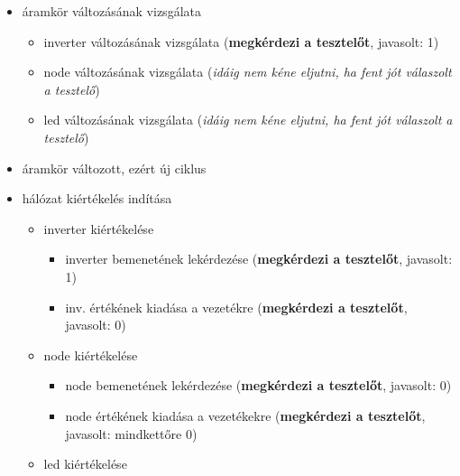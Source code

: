 {\begin{itemize}
\begin{itemize}
\begin{itemize}
	\begin{itemize}
	\setlength{\itemsep}{0cm}%
	\setlength{\parskip}{0cm}%
	\setlength{\itemindent}{-65pt}%
		\item led bemenetének lekérdezése (\textbf{megkérdezi a tesztelőt}, javasolt: 1)
	\end{itemize}
\end{itemize}
\item áramkör változásának vizsgálata
\begin{itemize}
\setlength{\itemsep}{0cm}%
\setlength{\parskip}{0cm}%
\setlength{\itemindent}{-50pt}%
	\item inverter változásának vizsgálata (\textbf{megkérdezi a tesztelőt}, javasolt: 1)
	\item node változásának vizsgálata (\textit{idáig nem kéne eljutni, ha fent jót válaszolt a tesztelő})
	\item led változásának vizsgálata (\textit{idáig nem kéne eljutni, ha fent jót válaszolt a tesztelő})
\end{itemize}
\item áramkör változott, ezért új ciklus
\item hálózat kiértékelés indítása
\begin{itemize}
\setlength{\itemsep}{0cm}%
\setlength{\parskip}{0cm}%
\setlength{\itemindent}{-50pt}%
	\item inverter kiértékelése
	\begin{itemize}
	\setlength{\itemsep}{0cm}%
	\setlength{\parskip}{0cm}%
	\setlength{\itemindent}{-65pt}%
		\item inverter bemenetének lekérdezése (\textbf{megkérdezi a tesztelőt}, javasolt: 1)
		\item inv. értékének kiadása a vezetékre (\textbf{megkérdezi a tesztelőt}, javasolt: 0)
	\end{itemize}
	\item node kiértékelése
	\begin{itemize}
	\setlength{\itemsep}{0cm}%
	\setlength{\parskip}{0cm}%
	\setlength{\itemindent}{-65pt}%
		\item node bemenetének lekérdezése (\textbf{megkérdezi a tesztelőt}, javasolt: 0)
		\item node értékének kiadása a vezetékekre (\textbf{megkérdezi a tesztelőt}, javasolt: mindkettőre 0)
	\end{itemize}
	\item led kiértékelése
	\begin{itemize}
	\setlength{\itemsep}{0cm}%
	\setlength{\parskip}{0cm}%

\end{itemize}
\end{itemize}
\end{itemize}
\end{itemize}}
